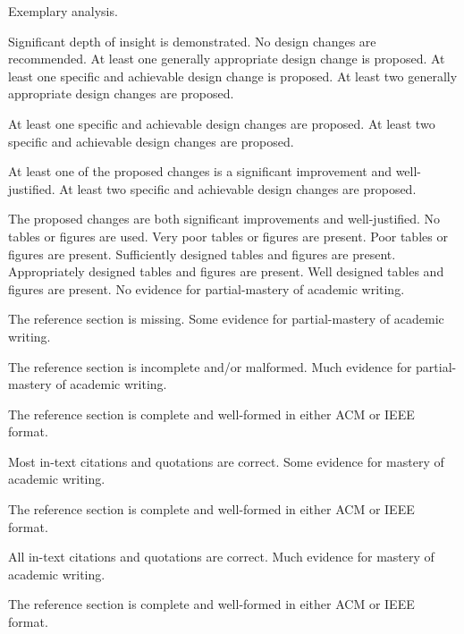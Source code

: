 \documentclass{../fal_assignment}
\begin{document}
\begin{markingrubric}
        \grade 		Exemplary analysis.
        \par 		Significant depth of insight is demonstrated.
%
        \grade\fail 	No design changes are recommended.
        \grade 		At least one generally appropriate design change is proposed.
        \grade 		At least one specific and achievable design change is proposed. 
        \grade 		At least two generally appropriate design changes are proposed.
        \par  		At least one specific and achievable design changes are proposed. 
        \grade 		At least two specific and achievable design changes are proposed. 
        \par  		At least one of the proposed changes is a significant improvement and well-justified.
        \grade 		At least two specific and achievable design changes are proposed. 
        \par  		The proposed changes are both significant improvements and well-justified.
%
        \grade\fail 	No tables or figures are used.
        \grade 		Very poor tables or figures are present.
        \grade 		Poor tables or figures are present. 
        \grade 		Sufficiently designed tables and figures are present. 
        \grade 		Appropriately designed tables and figures are present.
        \grade 		Well designed tables and figures are present. 
%
        \grade\fail 	No evidence for partial-mastery of academic writing.
        \par 		The reference section is missing.
        \grade 		Some evidence for partial-mastery of academic writing.
        \par 		The reference section is incomplete and/or malformed.
        \grade 		Much evidence for partial-mastery of academic writing.
        \par 		The reference section is complete and well-formed in either ACM or IEEE format.
        \par 		Most in-text citations and quotations are correct.
        \grade 		Some evidence for mastery of academic writing.
        \par 		The reference section is complete and well-formed in either ACM or IEEE format.
        \par 		All in-text citations and quotations are correct.
        \grade 		Much evidence for mastery of academic writing.
        \par 		The reference section is complete and well-formed in either ACM or IEEE format.

\end{markingrubric}
\end{document}
